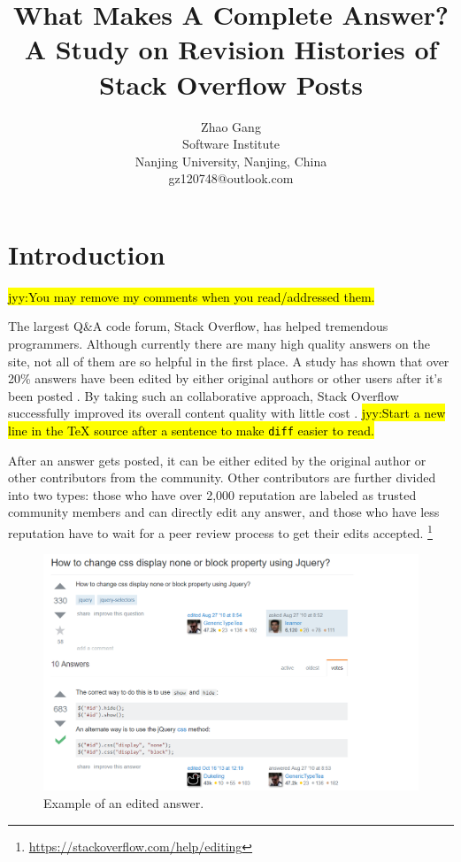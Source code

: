 \documentclass[10pt,conference]{IEEEtran}
\newcommand{\jyy}[1]{\sethlcolor{yellow}\hl{jyy:#1}\xspace}
\begin{document}
\title{What Makes A Complete Answer? A Study on Revision Histories of Stack Overflow Posts}
\author{Zhao Gang\\
Software Institute\\
Nanjing University, Nanjing, China\\
gz120748@outlook.com
}
\maketitle

\section {Introduction}

\jyy{You may remove my comments when you read/addressed them.}

The largest Q\&A code forum, Stack Overflow, has helped tremendous programmers.
Although currently there are many high quality answers on the site, not all of them are so helpful in the first place.
A study has shown that over 20\% answers have been edited by either original authors or other users after it's been posted \cite{7208aa781175403f9c3aaddc19f3b8cf}.
By taking such an collaborative approach, Stack Overflow successfully improved its overall content quality with little cost \cite{Chen:2017:CCD:3171581.3134667}.
\jyy{Start a new line in the \TeX{} source after a sentence to make \texttt{diff} easier to read.}

After an answer gets posted, it can be either edited by the original author or other contributors from the community. Other contributors are further divided into two types: those who have over 2,000 reputation are labeled as trusted community members and can directly edit any answer, and those who have less reputation have to wait for a peer review process to get their edits accepted.%
\footnote{\url{https://stackoverflow.com/help/editing}}

\begin{figure}
  \includegraphics[width=\linewidth]{figure1.png}
  \caption{Example of an edited answer.}
  \label{fig:jqueryAnswer}
\end{figure}
\end{document}
